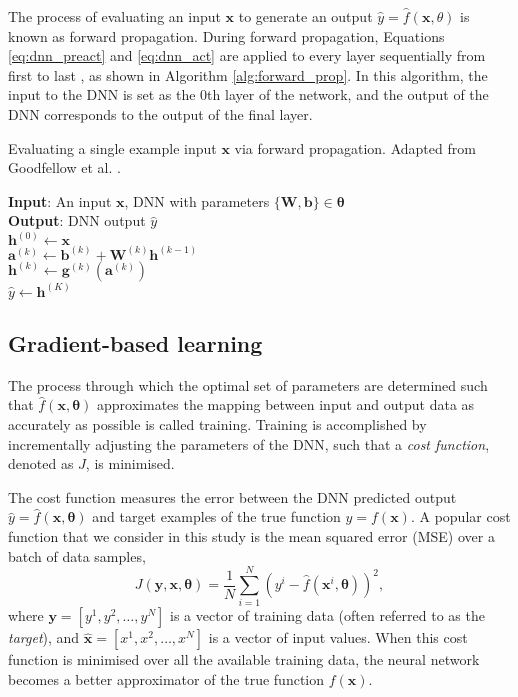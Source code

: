 The process of evaluating an input $\bm{x}$ to generate an output $\hat{y} = \hat{f}(\bm{x},\theta)$ is known as forward propagation.
During forward propagation, Equations \ref{eq:dnn_preact} and \ref{eq:dnn_act} are applied to every layer sequentially from first to last \cite{Goodfellow2016}, 
as shown in Algorithm \ref{alg:forward_prop}.
In this algorithm, the input to the DNN is set as the 0th layer of the network, and the output of the DNN corresponds to the output of the final layer.

\begin{algorithm}[htb!]
\caption[Evaluating a single example input via forward propagation]{Evaluating a single example input $\bm{x}$ via forward propagation. Adapted from Goodfellow et al. \cite{Goodfellow2016}.}
\label{alg:forward_prop}
\nonl\textbf{Input}: An input $\bm{x}$, DNN with parameters $\{\mathbf{W,b}\} \in \bm{\theta}$ \\
\nonl\textbf{Output}: DNN output $\hat{y}$ \\
\vspace{0.3cm} 
$\mathbf{h}^{(0)} \leftarrow \bm{x}$ \\
{
    $\mathbf{a}^{(k)} \leftarrow \mathbf{b}^{(k)} + \mathbf{W}^{(k)} \mathbf{h}^{(k-1)}$ \\
    $\mathbf{h}^{(k)} \leftarrow \mathbf{g}^{(k)}(\mathbf{a}^{(k)})$ \\
}
$\hat{y} \leftarrow \mathbf{h}^{(K)}$ \\
\end{algorithm}



\subsection{Gradient-based learning}\label{sec:grad_des}
The process through which the optimal set of parameters are determined such that $\hat{f}(\bm{x}, \bm{\theta})$ approximates the mapping between 
input and output data as accurately as possible is called training.
Training is accomplished by incrementally adjusting the parameters of the DNN, such that a \emph{cost function}, denoted as $J$, is minimised. 

The cost function measures the error between the DNN predicted output $\hat{y} = \hat{f}(\bm{x}, \bm{\theta})$ and target examples of the true function $y = f(\bm{x})$. 
A popular cost  function that we consider in this study is the mean squared error (MSE) over a batch of data samples,
\begin{equation}
    J( \bm{y}, \bm{x}, \bm{\theta}) = \frac{1}{N} \sum_{i=1}^{N} (y^i - \hat{f}(\bm{x}^i, \bm{\theta}))^2,
    \label{eq:cost_function}
\end{equation}
where $\bm{y} = [ y^1, y^2, \ldots , y^N ]$ is a vector of training data (often referred to as the \emph{target}), 
and $\bm{\hat{x}} = [ x^1, x^2, \ldots , x^N ]$ is a vector of input values.
When this cost function is minimised over all the available training data, the neural network becomes a better approximator of the true function $f(\bm{x})$.


